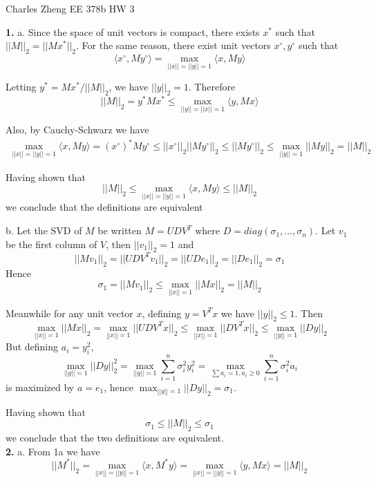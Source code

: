 \documentclass[11pt]{article}
\begin{document}
\newcommand{\tr}{\text{tr}}
\newcommand{\E}{\textbf{E}}
\newcommand{\diag}{\text{diag}}
\newcommand{\argmax}{\text{argmax}}
\newcommand{\Cov}{\text{Cov}}
\newcommand{\Var}{\text{Var}}
\renewcommand{\thefootnote}{\fnsymbol{footnote}}

\begin{center}
\noindent Charles Zheng EE 378b HW 3
\end{center}

\noindent\textbf{1.}
a.
Since the space of unit vectors is compact,
there exists $x^*$ such that $||M||_2 = ||Mx^*||_2$.
For the same reason, there exist unit vectors $x^\circ, y^\circ$ such that
\[
\langle x^\circ, M y^\circ \rangle = \max_{||x|| = ||y|| = 1} \langle x, My \rangle
\]

Letting $y^* = Mx^*/||M||_2$, we have $||y||_2 = 1$.
Therefore
\[
||M||_2 = y^* M x^* \leq \max_{||y||=||x||=1} \langle y, Mx \rangle
\]

Also, by Cauchy-Schwarz we have 
\begin{align*}
\max_{||x|| = ||y|| = 1} \langle x, My \rangle
= (x^\circ)^* M y^\circ
\leq ||x^\circ||_2 ||My^\circ||_2 \leq ||My^\circ||_2 
\leq \max_{||y||=1} ||My||_2 = ||M||_2
\end{align*}

Having shown that \[||M||_2 \leq \max_{||x|| = ||y|| = 1} \langle x, My \rangle \leq ||M||_2\]
we conclude that the definitions are equivalent

b.  Let the SVD of $M$ be written $M = UDV^T$ where $D =
diag(\sigma_1,\hdots, \sigma_n)$.
Let $v_1$ be the first column of $V$, then $||v_1||_2 = 1$ and
\[
||Mv_1||_2 = ||UDV^T v_1||_2 = ||UD e_1||_2 = ||De_1||_2 = \sigma_1
\]
Hence
\[
\sigma_1 = ||Mv_1||_2 \leq \max_{||x|| = 1} ||Mx||_2 = ||M||_2
\]

Meanwhile for any unit vector $x$, defining $y = V^T x$ we have $||y||_2 \leq 1$.
Then
\[
\max_{||x||=1} ||Mx||_2 = \max_{||x|| = 1} ||UDV^T x||_2
\leq \max_{||x|| = 1} ||DV^T x||_2 \leq \max_{||y|| = 1} ||Dy||_2
\]
But defining $a_i = y_i^2$,
\[
\max_{||y||=1} ||Dy||_2^2 = \max_{||y||=1} \sum_{i=1}^n \sigma_i^2 y_i^2
= \max_{\sum a_i = 1, a_i \geq 0} \sum_{i=1}^n \sigma_i^2 a_i
\]
is maximized by $a = e_1$, hence $\max_{||y|| = 1} ||Dy||_2 = \sigma_1$.

Having shown that
\[
\sigma_1 \leq ||M||_2 \leq \sigma_1
\]
we conclude that the two definitions are equivalent.\\

\noindent\textbf{2.}
a.
From 1a we have
\[
||M^*||_2 = \max_{||x||=||y||=1} \langle x, M^* y \rangle
= \max_{||x||=||y||=1} \langle y, M x \rangle = ||M||_2
\]
\end{document}
